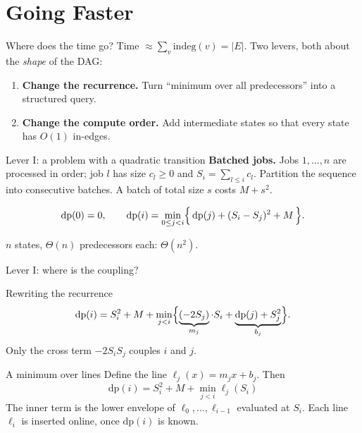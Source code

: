 \section{Going Faster}

\begin{frame}{Where does the time go?}
	Time $\approx\sum_v \text{indeg}(v)=|E|$. Two levers, both about the \emph{shape} of the DAG:

	\begin{enumerate}
		\item[\alert{I}] \textbf{Change the recurrence.} Turn
		``minimum over all predecessors'' into a structured query.
		\item[\alert{II}] \textbf{Change the compute order.} Add intermediate states so
		that every state has $O(1)$ in-edges.
	\end{enumerate}
\end{frame}

\begin{frame}{Lever I: a problem with a quadratic transition}
	\textbf{Batched jobs.} Jobs $1,\dots,n$ are processed in order; job $l$ has size $c_l\ge0$ and $S_i=\sum_{l\le i}c_l$.
	Partition the sequence into consecutive batches. A batch of total size $s$ costs $M+s^2$.

	\[
		\mathrm{dp}(0)=0,\qquad
		\mathrm{dp}(i)=\min_{0\le j<i}\Bigl\{\,\mathrm{dp}(j)+(S_i-S_j)^2+M\,\Bigr\}.
	\]

	$n$ states, $\Theta(n)$ predecessors each: $\Theta(n^2)$.
\end{frame}

\begin{frame}{Lever I: where is the coupling?}
\end{frame}

\begin{frame}{Rewriting the recurrence}
	\[
		\mathrm{dp}(i)=S_i^2+M+\min_{j<i}\Bigl\{\underbrace{(-2S_j)}_{m_j}\cdot S_i+\underbrace{\mathrm{dp}(j)+S_j^2}_{b_j}\Bigr\}.
	\]
	Only the cross term $-2S_iS_j$ couples $i$ and $j$.
\end{frame}

\begin{frame}{A minimum over lines}
	Define the line $\ell_j(x)=m_jx+b_j$. Then
	\[
		\boxed{\;\mathrm{dp}(i)=S_i^2+M+\min_{j<i}\ell_j(S_i)\;}
	\]
	The inner term is the \alert{lower envelope} of $\ell_0,\dots,\ell_{i-1}$ evaluated at $S_i$.
	Each line $\ell_i$ is inserted online, once $\mathrm{dp}(i)$ is known.
\end{frame}

